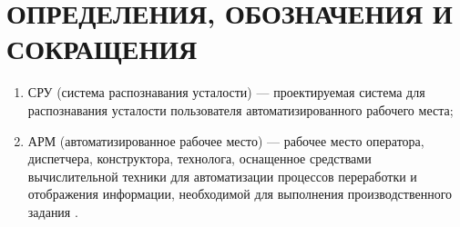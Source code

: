 \section*{ОПРЕДЕЛЕНИЯ, ОБОЗНАЧЕНИЯ И СОКРАЩЕНИЯ}

\begin{enumerate}[leftmargin=1.6\parindent]
\item СРУ (система распознавания усталости) --- проектируемая система для распознавания усталости пользователя автоматизированного рабочего места;
\item АРМ (автоматизированное рабочее место) --- рабочее место оператора, диспетчера, конструктора, технолога, оснащенное средствами вычислительной техники для автоматизации процессов переработки и отображения информации, необходимой для выполнения производственного задания \cite{polytechDic}.
\end{enumerate}





\pagebreak